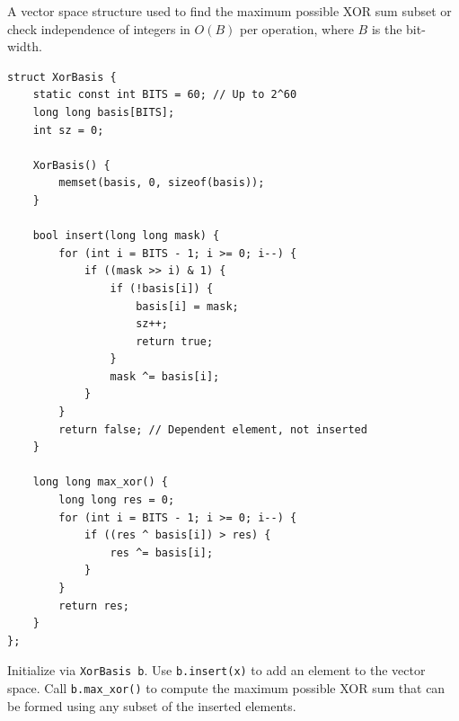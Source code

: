 
A vector space structure used to find the maximum possible XOR sum subset or check independence of integers in $O(B)$ per operation, where $B$ is the bit-width.
\begin{lstlisting}
struct XorBasis {
    static const int BITS = 60; // Up to 2^60
    long long basis[BITS];
    int sz = 0;

    XorBasis() {
        memset(basis, 0, sizeof(basis));
    }

    bool insert(long long mask) {
        for (int i = BITS - 1; i >= 0; i--) {
            if ((mask >> i) & 1) {
                if (!basis[i]) {
                    basis[i] = mask;
                    sz++;
                    return true;
                }
                mask ^= basis[i];
            }
        }
        return false; // Dependent element, not inserted
    }

    long long max_xor() {
        long long res = 0;
        for (int i = BITS - 1; i >= 0; i--) {
            if ((res ^ basis[i]) > res) {
                res ^= basis[i];
            }
        }
        return res;
    }
};
\end{lstlisting}

Initialize via \lstinline|XorBasis b|. Use \lstinline|b.insert(x)| to add an element to the vector space. Call \lstinline|b.max_xor()| to compute the maximum possible XOR sum that can be formed using any subset of the inserted elements.
